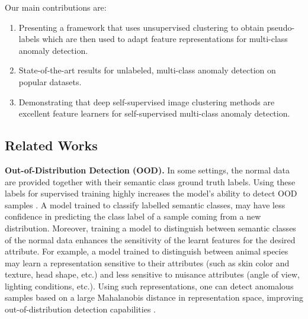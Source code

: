 \documentclass[runningheads]{llncs}
\begin{document}
Our main contributions are:

\begin{enumerate}

\item Presenting a framework that uses unsupervised clustering to obtain pseudo-labels which are then used to adapt feature representations for multi-class anomaly detection.

\item State-of-the-art results for unlabeled, multi-class anomaly detection on popular datasets.

\item Demonstrating that deep self-supervised image clustering methods are excellent feature learners for self-supervised multi-class anomaly detection.
\end{enumerate}



\subsection{Related Works}

\noindent\textbf{Out-of-Distribution Detection (OOD).} In some settings, the normal data are provided together with their semantic class ground truth labels. Using these labels for supervised training highly increases the model's ability to detect OOD samples \cite{hendrycks2016baseline}. A model trained to classify labelled semantic classes, may have less confidence in predicting the class label of a sample coming from a new distribution. Moreover, training a model to distinguish between semantic classes of the normal data enhances the sensitivity of the learnt features for the desired attribute. For example, a model trained to distinguish between animal species may learn a representation sensitive to their attributes (such as skin color and texture, head shape, etc.) and less sensitive to nuisance attributes (angle of view, lighting conditions, etc.). Using such representations, one can detect anomalous samples based on a large Mahalanobis distance in representation space, improving out-of-distribution detection capabilities \cite{lee2018simple,fort2021exploring}.
\end{document}
